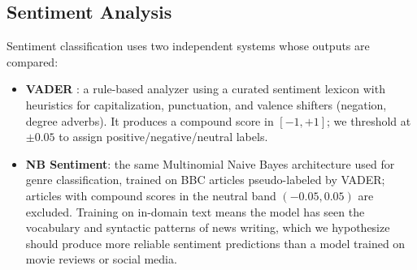 \subsection{Sentiment Analysis}

Sentiment classification uses two independent systems whose outputs are compared:

\begin{itemize}
    \item \textbf{VADER} \cite{hutto2014vader}: a rule-based analyzer using a curated sentiment lexicon with heuristics for capitalization, punctuation, and valence shifters (negation, degree adverbs). It produces a compound score in $[-1, +1]$; we threshold at $\pm 0.05$ to assign positive/negative/neutral labels.

    \item \textbf{NB Sentiment}: the same Multinomial Naive Bayes architecture used for genre classification, trained on BBC articles pseudo-labeled by VADER; articles with compound scores in the neutral band $(-0.05, 0.05)$ are excluded. Training on in-domain text means the model has seen the vocabulary and syntactic patterns of news writing, which we hypothesize should produce more reliable sentiment predictions than a model trained on movie reviews or social media.
\end{itemize}
